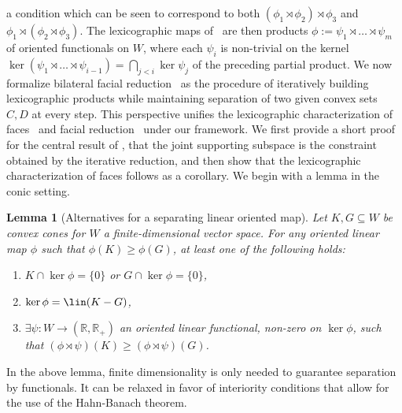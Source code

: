 \documentclass{article}
\theoremstyle{plain}
\newtheorem{lemma}[lemma]{Lemma}
\theoremstyle{definition}
\theoremstyle{remark}
\begin{document}
a condition which can be seen to correspond to both $(\phi_1 \rtimes \phi_2) \rtimes \phi_3$ and $\phi_1 \rtimes (\phi_2 \rtimes \phi_3)$.
The lexicographic maps of~\cite{martinez-legaz_LEXICOGRAPHICALCHARACTERIZATIONFACES_}
are then products $\phi := \psi_1 \rtimes \ldots \rtimes \psi_m$ of oriented functionals on $W$, where each $\psi_i$ is non-trivial on the kernel $\ker(\psi_1 \rtimes \ldots \rtimes \psi_{i-1}) = \bigcap_{j<i}\ker\psi_j$ of the preceding partial product.
We now formalize bilateral facial reduction~\cite{scottBilateralFacialReduction2026}
as the procedure of iteratively building lexicographic products while 
maintaining separation of two given convex sets $C, D$ at every step.
This perspective unifies the lexicographic characterization of faces~\cite{martinez-legaz_LEXICOGRAPHICALCHARACTERIZATIONFACES_}
and facial reduction~\cite{drusvyatskiyManyFacesDegeneracy2017} under our framework.
We first provide a short proof for the central result of \cite{scottBilateralFacialReduction2026},
that the joint supporting subspace is the constraint obtained by the iterative reduction,
and then show that the lexicographic characterization of faces follows as a corollary. We begin with a lemma in
the conic setting.
\begin{lemma}[Alternatives for a separating linear oriented map]
\label{loc:alternatives_for_a_separating_linear_oriented_map.statement}
Let $K,G \subseteq W$ be convex cones for $W$ a finite-dimensional
vector space. For any oriented linear map $\phi$ such that $\phi(K) \geq \phi(G)$, at least one of the following holds:
\begin{enumerate}
\item $K \cap \ker \phi = \{0\}$ or $G \cap \ker \phi = \{0\}$,
\item $\ker \phi = \lin(K-G)$,
\item $\exists \psi:W \to (\mathbb{R}, \mathbb{R}_+)$ an oriented linear functional, non-zero on $\ker\phi$, such that $(\phi \rtimes \psi)(K) \geq (\phi \rtimes \psi)(G)$.
\end{enumerate}
\end{lemma}
In the above lemma, finite dimensionality is only needed to guarantee separation by functionals. It can be relaxed in favor of interiority conditions that allow for the use of the Hahn-Banach theorem.
\end{document}
